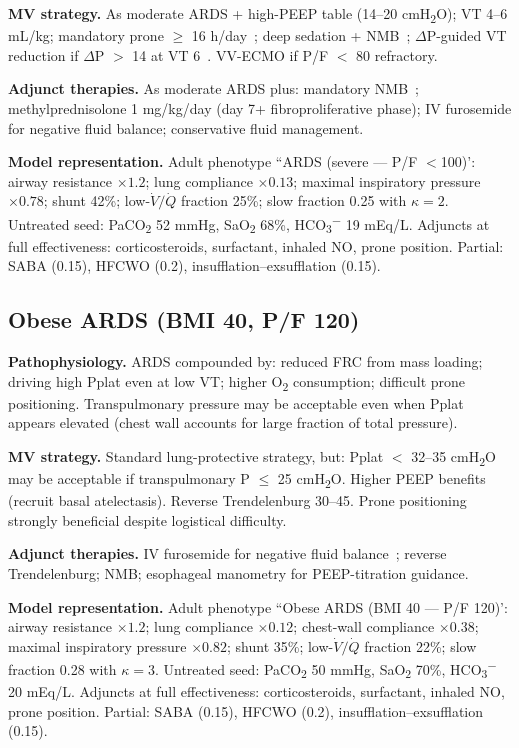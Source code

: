 \textbf{MV strategy.} As moderate ARDS + high-PEEP table (14--20 cmH\textsubscript{2}O); VT 4--6 mL/kg; mandatory prone $\geq$ 16 h/day~\citep{guerin2013a}; deep sedation + NMB~\citep{papazian2010}; $\Delta$P-guided VT reduction if $\Delta$P $>$ 14 at VT 6~\citep{amato2015}. VV-ECMO if P/F $<$ 80 refractory.

\textbf{Adjunct therapies.} As moderate ARDS plus: mandatory NMB~\citep{papazian2010}; methylprednisolone 1 mg/kg/day (day 7+ fibroproliferative phase); IV furosemide for negative fluid balance; conservative fluid management.

\textbf{Model representation.} Adult phenotype ``ARDS (severe --- P/F $<$100)': airway resistance $\times1.2$; lung compliance $\times0.13$; maximal inspiratory pressure $\times0.78$; shunt 42\%; low-$\dot V/\dot Q$ fraction 25\%; slow fraction 0.25 with $\kappa=2$. Untreated seed: PaCO\textsubscript{2} 52 mmHg, SaO\textsubscript{2} 68\%, HCO\textsubscript{3}\textsuperscript{$-$} 19 mEq/L. Adjuncts at full effectiveness: corticosteroids, surfactant, inhaled NO, prone position. Partial: SABA (0.15), HFCWO (0.2), insufflation--exsufflation (0.15).

\subsection{Obese ARDS (BMI 40, P/F 120)}
\textbf{Pathophysiology.} ARDS compounded by: reduced FRC from mass loading; driving high Pplat even at low VT; higher O\textsubscript{2} consumption; difficult prone positioning. Transpulmonary pressure may be acceptable even when Pplat appears elevated (chest wall accounts for large fraction of total pressure).

\textbf{MV strategy.} Standard lung-protective strategy, but: Pplat $<$ 32--35 cmH\textsubscript{2}O may be acceptable if transpulmonary P $\leq$ 25 cmH\textsubscript{2}O. Higher PEEP benefits (recruit basal atelectasis). Reverse Trendelenburg 30--45\textdegree{}. Prone positioning strongly beneficial despite logistical difficulty.

\textbf{Adjunct therapies.} IV furosemide for negative fluid balance~\citep{marini1992,lemaire1988}; reverse Trendelenburg; NMB; esophageal manometry for PEEP-titration guidance.

\textbf{Model representation.} Adult phenotype ``Obese ARDS (BMI 40 --- P/F 120)': airway resistance $\times1.2$; lung compliance $\times0.12$; chest-wall compliance $\times0.38$; maximal inspiratory pressure $\times0.82$; shunt 35\%; low-$\dot V/\dot Q$ fraction 22\%; slow fraction 0.28 with $\kappa=3$. Untreated seed: PaCO\textsubscript{2} 50 mmHg, SaO\textsubscript{2} 70\%, HCO\textsubscript{3}\textsuperscript{$-$} 20 mEq/L. Adjuncts at full effectiveness: corticosteroids, surfactant, inhaled NO, prone position. Partial: SABA (0.15), HFCWO (0.2), insufflation--exsufflation (0.15).

